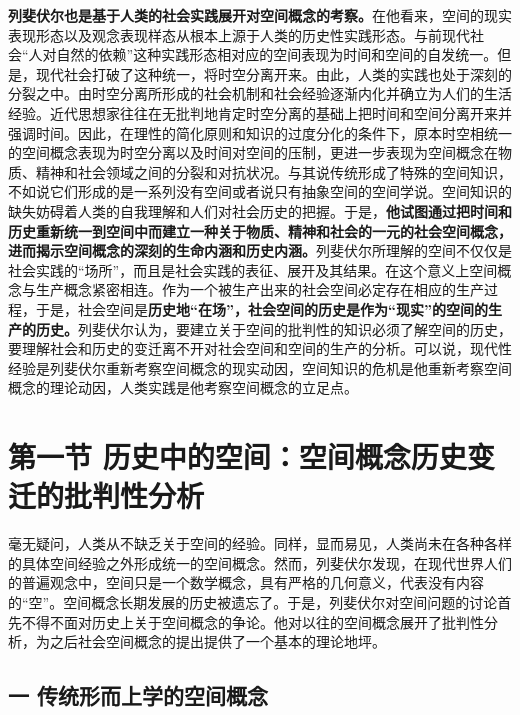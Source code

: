 \documentclass[UTF8, fontset = sourcesans, a4paper, oneside, zihao =
-4, scheme=chinese, no-math, space=true]{ctexbook}
\begin{document}
\textbf{列斐伏尔也是基于人类的社会实践展开对空间概念的考察。}在他看来，空间的现实表现形态以及观念表现样态从根本上源于人类的历史性实践形态。与前现代社会``人对自然的依赖''这种实践形态相对应的空间表现为时间和空间的自发统一。但是，现代社会打破了这种统一，将时空分离开来。由此，人类的实践也处于深刻的分裂之中。由时空分离所形成的社会机制和社会经验逐渐内化并确立为人们的生活经验。近代思想家往往在无批判地肯定时空分离的基础上把时间和空间分离开来并强调时间。因此，在理性的简化原则和知识的过度分化的条件下，原本时空相统一的空间概念表现为时空分离以及时间对空间的压制，更进一步表现为空间概念在物质、精神和社会领域之间的分裂和对抗状况。与其说传统形成了特殊的空间知识，不如说它们形成的是一系列没有空间或者说只有抽象空间的空间学说。空间知识的缺失妨碍着人类的自我理解和人们对社会历史的把握。于是，\textbf{他试图通过把时间和历史重新统一到空间中而建立一种关于物质、精神和社会的一元的社会空间概念，进而揭示空间概念的深刻的生命内涵和历史内涵。}列斐伏尔所理解的空间不仅仅是社会实践的``场所''，而且是社会实践的表征、展开及其结果。在这个意义上空间概念与生产概念紧密相连。作为一个被生产出来的社会空间必定存在相应的生产过程，于是，社会空间是\textbf{历史地``在场''，社会空间的历史是作为``现实''的空间的生产的历史。}列斐伏尔认为，要建立关于空间的批判性的知识必须了解空间的历史，要理解社会和历史的变迁离不开对社会空间和空间的生产的分析。可以说，现代性经验是列斐伏尔重新考察空间概念的现实动因，空间知识的危机是他重新考察空间概念的理论动因，人类实践是他考察空间概念的立足点。

\protect\hypertarget{part0006_split_001.html}{}{}

\hypertarget{part0006_split_001.htmlux5cux23b004}{\section{第一节
历史中的空间：空间概念历史变迁的批判性分析}\label{part0006_split_001.htmlux5cux23b004}}

毫无疑问，人类从不缺乏关于空间的经验。同样，显而易见，人类尚未在各种各样的具体空间经验之外形成统一的空间概念。然而，列斐伏尔发现，在现代世界人们的普遍观念中，空间只是一个数学概念，具有严格的几何意义，代表没有内容的``空''。空间概念长期发展的历史被遗忘了。于是，列斐伏尔对空间问题的讨论首先不得不面对历史上关于空间概念的争论。他对以往的空间概念展开了批判性分析，为之后社会空间概念的提出提供了一个基本的理论地坪。

\subsection{一
传统形而上学的空间概念}\label{part0006_split_001.htmlux5cux23c013}
\end{document}
